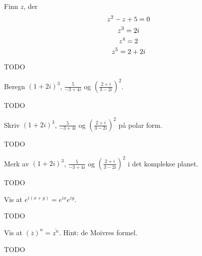 
\begin{oppgave}
Finn $z$, der
\[
z^2-z+5=0 \\
\]
\[
z^3=2i \\
\]
\[
z^4=2 \\
\]
\[
z^5=2+2i \\
\]
\end{oppgave}

\begin{losning}
TODO
\end{losning}


\begin{oppgave}
Beregn $(1+2i)^3$, $\frac{5}{-3+4i}$ og $\left(\frac{2+i}{3-2i}\right)^2$.
\end{oppgave}

\begin{losning}
TODO
\end{losning}


\begin{oppgave}
Skriv $(1+2i)^3$, $\frac{5}{-3+4i}$ og $\left(\frac{2+i}{3-2i}\right)^2$ på polar form.
\end{oppgave}

\begin{losning}
TODO
\end{losning}


\begin{oppgave}
Merk av $(1+2i)^3$, $\frac{5}{-3+4i}$ og $\left(\frac{2+i}{3-2i}\right)^2$ i det komplekse planet.
\end{oppgave}

\begin{losning}
TODO
\end{losning}


\begin{oppgave}
Vis at $e^{i(x+y)}=e^{ix}e^{iy}$.
\end{oppgave}

\begin{losning}
TODO
\end{losning}


\begin{oppgave}
Vis at $(\overline z)^n=\overline{z^n}$. Hint: de Moivres formel.
\end{oppgave}

\begin{losning}
TODO
\end{losning}
